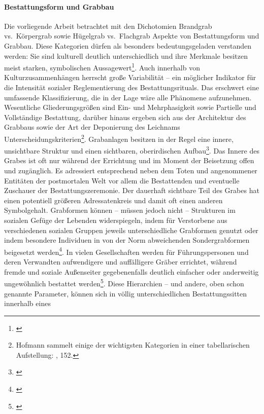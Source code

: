 \documentclass[openany,twoside,twocolumn]{book}
\let\rmarkdownfootnote\footnote%
\def\footnote{\protect\rmarkdownfootnote}
\begin{document}
\hypertarget{grave-architecture}{%
\paragraph{Bestattungsform und Grabbau}\label{grave-architecture}}

Die vorliegende Arbeit betrachtet mit den Dichotomien Brandgrab
vs.~Körpergrab sowie Hügelgrab vs.~Flachgrab Aspekte von Bestattungsform
und Grabbau. Diese Kategorien dürfen als besonders bedeutungsgeladen
verstanden werden: Sie sind kulturell deutlich unterschiedlich und ihre
Merkmale besitzen meist starken, symbolischen Aussagewert\footnote{\textcite{kaliff_grave_1998}}.
Auch innerhalb von Kulturzusammenhängen herrscht große Variabilität --
ein möglicher Indikator für die Intensität sozialer Reglementierung des
Bestattungsrituals. Das erschwert eine umfassende Klassifizierung, die
in der Lage wäre alle Phänomene aufzunehmen. Wesentliche
Gliederungsgrößen sind Ein- und Mehrphasigkeit sowie Partielle und
Vollständige Bestattung, darüber hinaus ergeben sich aus der Architektur
des Grabbaus sowie der Art der Deponierung des Leichnams
Unterscheidungskriterien\footnote{Hofmann sammelt einige der wichtigsten
  Kategorien in einer tabellarischen Aufstellung:
  \textcite{hofmann_rituelle_2008}, 152.}. Grabanlagen besitzen in der
Regel eine innere, unsichtbare Struktur und einen sichtbaren,
oberirdischen Aufbau\footnote{\textcite{skjoldebrand_variations_1995}}.
Das Innere des Grabes ist oft nur während der Errichtung und im Moment
der Beisetzung offen und zugänglich. Es adressiert entsprechend neben
dem Toten und angenommener Entitäten der postmortalen Welt vor allem die
Bestattenden und eventuelle Zuschauer der Bestattungszeremonie. Der
dauerhaft sichtbare Teil des Grabes hat einen potentiell größeren
Adressatenkreis und damit oft einen anderen Symbolgehalt. Grabformen
können -- müssen jedoch nicht -- Strukturen im sozialen Gefüge der
Lebenden widerspiegeln, indem für Verstorbene aus verschiedenen sozialen
Gruppen jeweils unterschiedliche Grabformen genutzt oder indem besondere
Individuen in von der Norm abweichenden Sondergrabformen beigesetzt
werden\footnote{\textcite{hodder_social_1980}}. In vielen Gesellschaften
werden für Führungspersonen und deren Verwandten aufwendigere und
auffälligere Gräber errichtet, während fremde und soziale Außenseiter
gegebenenfalls deutlich einfacher oder anderweitig ungewöhnlich
bestattet werden\footnote{\textcite{pauli_ungewohnliche_1978}}. Diese
Hierarchien -- und andere, oben schon genannte Parameter, können sich in
völlig unterschiedlichen Bestattungssitten innerhalb eines
\end{document}
